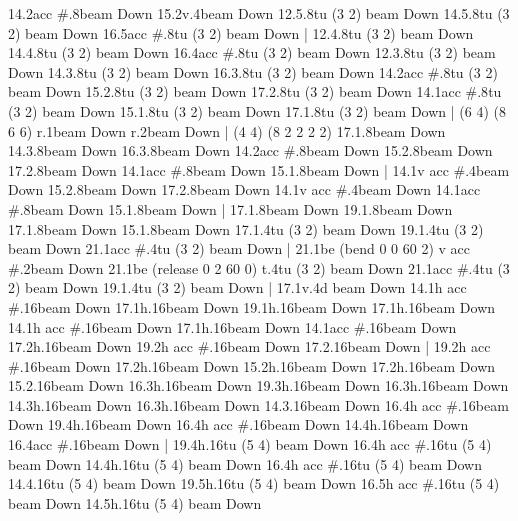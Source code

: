       14.2{acc #}.8{beam Down}
      15.2{v}.4{beam Down}
      12.5.8{tu (3 2) beam Down}
      14.5.8{tu (3 2) beam Down}
      16.5{acc #}.8{tu (3 2) beam Down}
    |
      12.4.8{tu (3 2) beam Down}
      14.4.8{tu (3 2) beam Down}
      16.4{acc #}.8{tu (3 2) beam Down}
      12.3.8{tu (3 2) beam Down}
      14.3.8{tu (3 2) beam Down}
      16.3.8{tu (3 2) beam Down}
      14.2{acc #}.8{tu (3 2) beam Down}
      15.2.8{tu (3 2) beam Down}
      17.2.8{tu (3 2) beam Down}
      14.1{acc #}.8{tu (3 2) beam Down}
      15.1.8{tu (3 2) beam Down}
      17.1.8{tu (3 2) beam Down}
    |
    \ts (6 4)
    \beaming (8 6 6)
      r.1{beam Down}
      r.2{beam Down}
    |
    \ts (4 4)
    \beaming (8 2 2 2 2)
      17.1.8{beam Down}
      14.3.8{beam Down}
      16.3.8{beam Down}
      14.2{acc #}.8{beam Down}
      15.2.8{beam Down}
      17.2.8{beam Down}
      14.1{acc #}.8{beam Down}
      15.1.8{beam Down}
    |
      14.1{v acc #}.4{beam Down}
      15.2.8{beam Down}
      17.2.8{beam Down}
      14.1{v acc #}.4{beam Down}
      14.1{acc #}.8{beam Down}
      15.1.8{beam Down}
    |
      17.1.8{beam Down}
      19.1.8{beam Down}
      17.1.8{beam Down}
      15.1.8{beam Down}
      17.1.4{tu (3 2) beam Down}
      19.1.4{tu (3 2) beam Down}
      21.1{acc #}.4{tu (3 2) beam Down}
    |
      21.1{be (bend 0 0 60 2) v acc #}.2{beam Down}
      21.1{be (release 0 2 60 0) t}.4{tu (3 2) beam Down}
      21.1{acc #}.4{tu (3 2) beam Down}
      19.1.4{tu (3 2) beam Down}
    |
      17.1{v}.4{d beam Down}
      14.1{h acc #}.16{beam Down}
      17.1{h}.16{beam Down}
      19.1{h}.16{beam Down}
      17.1{h}.16{beam Down}
      14.1{h acc #}.16{beam Down}
      17.1{h}.16{beam Down}
      14.1{acc #}.16{beam Down}
      17.2{h}.16{beam Down}
      19.2{h acc #}.16{beam Down}
      17.2.16{beam Down}
    |
      19.2{h acc #}.16{beam Down}
      17.2{h}.16{beam Down}
      15.2{h}.16{beam Down}
      17.2{h}.16{beam Down}
      15.2.16{beam Down}
      16.3{h}.16{beam Down}
      19.3{h}.16{beam Down}
      16.3{h}.16{beam Down}
      14.3{h}.16{beam Down}
      16.3{h}.16{beam Down}
      14.3.16{beam Down}
      16.4{h acc #}.16{beam Down}
      19.4{h}.16{beam Down}
      16.4{h acc #}.16{beam Down}
      14.4{h}.16{beam Down}
      16.4{acc #}.16{beam Down}
    |
      19.4{h}.16{tu (5 4) beam Down}
      16.4{h acc #}.16{tu (5 4) beam Down}
      14.4{h}.16{tu (5 4) beam Down}
      16.4{h acc #}.16{tu (5 4) beam Down}
      14.4.16{tu (5 4) beam Down}
      19.5{h}.16{tu (5 4) beam Down}
      16.5{h acc #}.16{tu (5 4) beam Down}
      14.5{h}.16{tu (5 4) beam Down}

